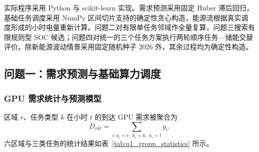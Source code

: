 
实际程序采用 Python 与 scikit-learn 实现。需求预测采用固定 Huber 滞后回归，基础任务调度采用 NumPy 区间切片支持的确定性贪心构造，能源流根据真实调度形成的小时电量重新计算。问题二对有限单任务邻域作全量复算，问题三搜索有限规则型 SOC 候选；问题四对统一的三个任务方案执行两轮顺序任务—储能交替评价。除新能源波动情景采用固定随机种子 $2026$ 外，其余过程均为确定性构造。

\subsection{问题一：需求预测与基础算力调度}

\subsubsection{GPU 需求统计与预测模型}

区域 $r$、任务类型 $k$ 在小时 $t$ 的到达 GPU 需求被聚合为
\begin{equation}
D_{rkt}=\sum_{i:o_i=r,\;k_i=k,\;a_i=t}g_i.
\end{equation}
六区域与三类任务的统计结果如表~\ref{tab:q1_group_statistics} 所示。

